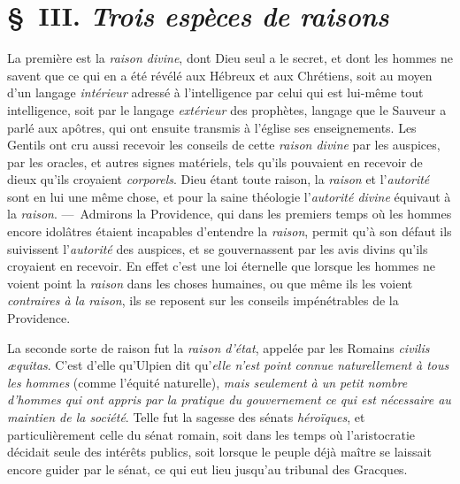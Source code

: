 \documentclass[french,twoside]{book} %
\begin{document}
\section[{§ III. Trois espèces de raisons}]{§ III. {\itshape Trois espèces de raisons}}
\noindent La première est la {\itshape raison divine}, dont Dieu seul a le secret, et dont les hommes ne savent que ce qui en a été révélé aux Hébreux et aux Chrétiens, soit au moyen d’un langage {\itshape intérieur} adressé à l’intelligence par celui qui est lui-même tout intelligence, soit par le langage {\itshape extérieur} des prophètes, langage que le Sauveur a parlé aux apôtres, qui ont ensuite transmis à l’église ses enseignements. Les Gentils ont cru aussi recevoir les conseils de cette {\itshape raison divine} par les auspices, par les oracles, et autres signes matériels, tels qu’ils pouvaient en recevoir de dieux qu’ils croyaient {\itshape corporels}. Dieu étant toute raison, la {\itshape raison} et l’{\itshape autorité} sont en lui une même chose, et pour la saine théologie l’{\itshape autorité divine} équivaut à la {\itshape raison}. — Admirons la Providence, qui dans les premiers temps où les hommes encore idolâtres étaient incapables d’entendre la {\itshape raison}, permit qu’à son défaut ils suivissent l’{\itshape autorité} des auspices, et se gouvernassent par les avis divins qu’ils croyaient en recevoir. En effet c’est une loi éternelle que lorsque les hommes ne voient point la {\itshape raison} dans les choses humaines, ou que même ils les voient {\itshape contraires à la raison}, ils se reposent  sur les conseils impénétrables de la Providence.\par
La seconde sorte de raison fut la {\itshape raison d’état}, appelée par les Romains {\itshape civilis æquitas}. C’est d’elle qu’Ulpien dit qu’\emph{{\itshape elle n’est point connue naturellement à tous les hommes}} (comme l’équité naturelle), \emph{{\itshape mais seulement à un petit nombre d’hommes qui ont appris par la pratique du gouvernement ce qui est nécessaire au maintien de la société}}. Telle fut la sagesse des sénats {\itshape héroïques}, et particulièrement celle du sénat romain, soit dans les temps où l’aristocratie décidait seule des intérêts publics, soit lorsque le peuple déjà maître se laissait encore guider par le sénat, ce qui eut lieu jusqu’au tribunal des Gracques.
\end{document}
